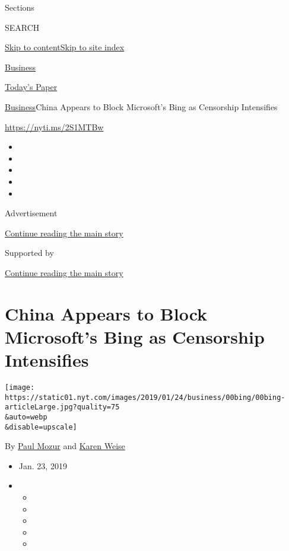 Sections

SEARCH

\protect\hyperlink{site-content}{Skip to
content}\protect\hyperlink{site-index}{Skip to site index}

\href{https://www.nytimes.com/section/business}{Business}

\href{https://myaccount.nytimes.com/auth/login?response_type=cookie\&client_id=vi}{}

\href{https://www.nytimes.com/section/todayspaper}{Today's Paper}

\href{/section/business}{Business}\textbar{}China Appears to Block
Microsoft's Bing as Censorship Intensifies

\url{https://nyti.ms/2S1MTBw}

\begin{itemize}
\item
\item
\item
\item
\item
\end{itemize}

Advertisement

\protect\hyperlink{after-top}{Continue reading the main story}

Supported by

\protect\hyperlink{after-sponsor}{Continue reading the main story}

\hypertarget{china-appears-to-block-microsofts-bing-as-censorship-intensifies}{%
\section{China Appears to Block Microsoft's Bing as Censorship
Intensifies}\label{china-appears-to-block-microsofts-bing-as-censorship-intensifies}}

\texttt{[image: https://static01.nyt.com/images/2019/01/24/business/00bing/00bing-articleLarge.jpg?quality=75\\\&auto=webp\\\&disable=upscale]}

By \href{https://www.nytimes.com/by/paul-mozur}{Paul Mozur} and
\href{https://www.nytimes.com/by/karen-weise}{Karen Weise}

\begin{itemize}
\item
  Jan. 23, 2019
\item
  \begin{itemize}
  \item
  \item
  \item
  \item
  \item
  \end{itemize}
\end{itemize}

